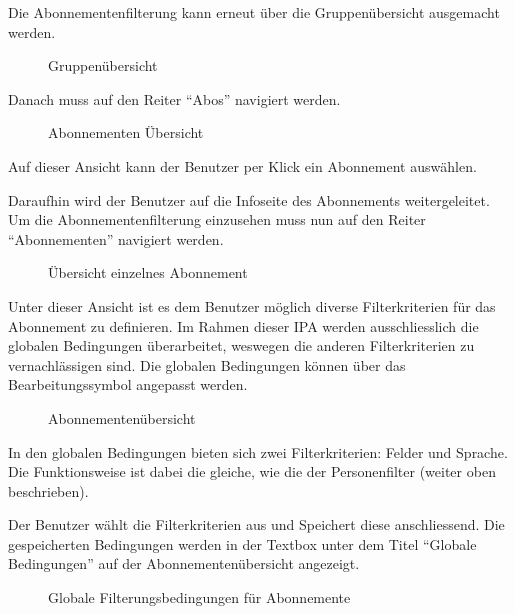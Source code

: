 Die Abonnementenfilterung kann erneut über die Gruppenübersicht ausgemacht werden.

\begin{figure}[h]
   \centering
   \caption{Gruppenübersicht}
\end{figure}

Danach muss auf den Reiter ``Abos'' navigiert werden.

\begin{figure}[h]
   \centering
   \caption{Abonnementen Übersicht}
\end{figure}

Auf dieser Ansicht kann der Benutzer per Klick ein Abonnement auswählen.

\newpage

Daraufhin wird der Benutzer auf die Infoseite des Abonnements weitergeleitet. Um die Abonnementenfilterung
einzusehen muss nun auf den Reiter ``Abonnementen'' navigiert werden.

\begin{figure}[h]
   \centering
   \caption{Übersicht einzelnes Abonnement}
\end{figure}

Unter dieser Ansicht ist es dem Benutzer möglich diverse Filterkriterien für das Abonnement zu definieren.
Im Rahmen dieser IPA werden ausschliesslich die globalen Bedingungen überarbeitet, weswegen die anderen Filterkriterien
zu vernachlässigen sind. Die globalen Bedingungen können über das Bearbeitungssymbol angepasst werden.

\begin{figure}[h]
   \centering
   \caption{Abonnementenübersicht}
\end{figure}

\newpage


In den globalen Bedingungen bieten sich zwei Filterkriterien: Felder und Sprache. Die Funktionsweise
ist dabei die gleiche, wie die der Personenfilter (weiter oben beschrieben).

Der Benutzer wählt die Filterkriterien aus und Speichert diese anschliessend. Die gespeicherten Bedingungen 
werden in der Textbox unter dem Titel ``Globale Bedingungen'' auf der Abonnementenübersicht angezeigt.
\begin{figure}[h]
   \centering
   \caption{Globale Filterungsbedingungen für Abonnemente}
\end{figure}

